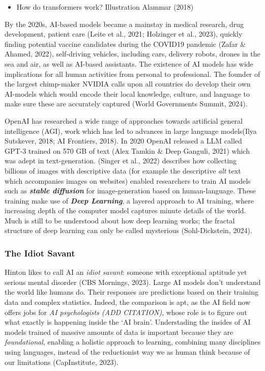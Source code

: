 \documentclass[
  letterpaper,
  DIV=11,
  numbers=noendperiod]{scrartcl}
\providecommand{\tightlist}{%
  \setlength{\itemsep}{0pt}\setlength{\parskip}{0pt}}\usepackage{longtable,booktabs,array}
\begin{document}
\begin{itemize}
\tightlist
\item
  How do transformers work? Illustration Alammar (2018)
\end{itemize}

By the 2020s, AI-based models became a mainstay in medical research,
drug development, patient care (Leite et al., 2021; Holzinger et al.,
2023), quickly finding potential vaccine candidates during the COVID19
pandemic (Zafar \& Ahamed, 2022), self-driving vehicles, including cars,
delivery robots, drones in the sea and air, as well as AI-based
assistants. The existence of AI models has wide implications for all
human activities from personal to professional. The founder of the
largest chimp-maker NVIDIA calls upon all countries do develop their own
AI-models which would encode their local knowledge, culture, and
language to make sure these are accurately captured (World Governments
Summit, 2024).

OpenAI has researched a wide range of approaches towards artificial
general intelligence (AGI), work which has led to advances in large
language models(Ilya Sutskever, 2018; AI Frontiers, 2018). In 2020
OpenAI released a LLM called GPT-3 trained on 570 GB of text (Alex
Tamkin \& Deep Ganguli, 2021) which was adept in text-generation.
(Singer et al., 2022) describes how collecting billions of images with
descriptive data (for example the descriptive \emph{alt} text which
accompanies images on websites) enabled researchers to train AI models
such as \textbf{\emph{stable diffusion}} for image-generation based on
human-language. These training make use of \textbf{\emph{Deep
Learning}}, a layered approach to AI training, where increasing depth of
the computer model captures minute details of the world. Much is still
to be understood about how deep learning works; the fractal structure of
deep learning can only be called mysterious (Sohl-Dickstein, 2024).

\subsubsection{The Idiot Savant}\label{the-idiot-savant}

Hinton likes to call AI an \emph{idiot savant}: someone with exceptional
aptitude yet serious mental disorder (CBS Mornings, 2023). Large AI
models don't understand the world like humans do. Their responses are
predictions based on their training data and complex statistics. Indeed,
the comparison is apt, as the AI field now offers jobs for \emph{AI
psychologists (ADD CITATION)}, whose role is to figure out what exactly
is happening inside the `AI brain'. Understading the insides of AI
models trained of massive amounts of data is important because they are
\emph{foundational}, enabling a holistic approach to learning, combining
many disciplines using languages, instead of the reductionist way we as
human think because of our limitations (CapInstitute, 2023).
\end{document}
